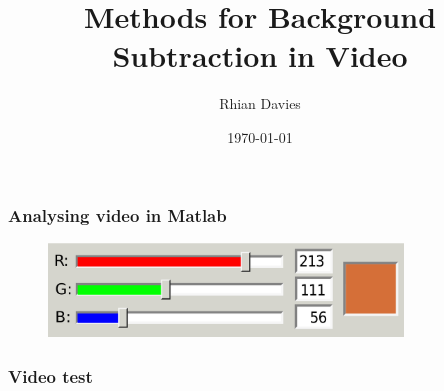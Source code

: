 \documentclass{beamer}
\begin{document}
\title{Methods for Background Subtraction in Video}
\subtitle{}
\author{Rhian Davies}

\date{\today}

\begin{frame}[plain] 
  \titlepage
\end{frame}

\begin{frame}
  \frametitle{Analysing video in Matlab}
  \begin{figure}[h]
    \centering
    \includegraphics[height = 2.5cm]{rgbslider.png}
  \end{figure}
\end{frame}

\begin{frame}
  \frametitle{Video test}

\begin{figure}[ht]
\end{figure}

\end{frame}


%
%
%
\end{document}
